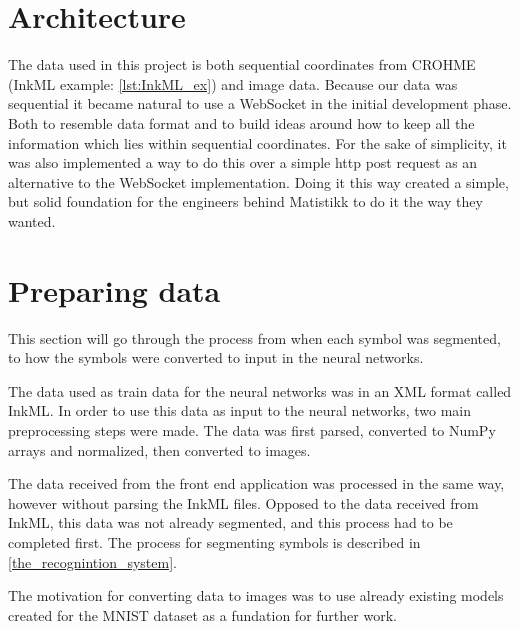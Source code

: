 \section{Architecture}
The data used in this project is both sequential coordinates from CROHME (InkML example: \ref{lst:InkML_ex}) and image data. Because our data was sequential it became natural to use a WebSocket in the initial development phase. Both to resemble data format and to build ideas around how to keep all the information which lies within sequential coordinates. 
For the sake of simplicity, it was also implemented a way to do this over a simple http post request as an alternative to the WebSocket implementation. Doing it this way created a simple, but solid foundation for the engineers behind Matistikk to do it the way they wanted. \\

\section{Preparing data}
This section will go through the process from when each symbol was segmented, to how the symbols were converted to input in the neural networks.

The data used as train data for the neural networks was in an XML format called InkML. In order to use this data as input to the neural networks, two main preprocessing steps were made. The data was first parsed, converted to NumPy arrays and normalized, then converted to images.

The data received from the front end application was processed in the same way, however without parsing the InkML files. Opposed to the data received from InkML, this data was not already segmented, and this process had to be completed first. The process for segmenting symbols is described in \ref{the_recognintion_system}.

The motivation for converting data to images was to use already existing models created for the MNIST dataset as a fundation for further work.

